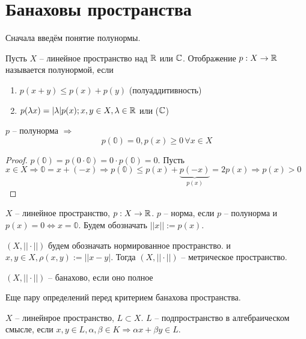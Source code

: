 \documentclass[document]{subfiles}
\begin{document}
\section{Банаховы пространства}

Сначала введём понятие полунормы.
\begin{definition}[полунорма]
    Пусть $X$ -- линейное пространство над $\mathbb{R}$ или $\mathbb{C}$. Отображение $p: X \rightarrow \mathbb{R}$ называется полунормой, если
    \begin{enumerate}
        \item $p(x + y) \leq p(x) + p(y)$ (полуаддитивность)
        \item $p(\lambda x) = |\lambda| p(x); x,y \in X, \lambda \in \mathbb{R}$ или ($\mathbb{C}$)
    \end{enumerate} 
\end{definition}

\begin{property}
    $p$ -- полунорма $\Rightarrow$
    \[ p(\mathbb{0}) = 0, p(x) \geq 0 \, \forall x \in X\]
\end{property}

\begin{proof}
    $p(\mathbb{0}) = p(0 \cdot \mathbb{0}) = 0 \cdot p(\mathbb{0}) = 0$.
    Пусть $x \in X \Rightarrow \mathbb{0} = x + (-x) \Rightarrow p(\mathbb{0}) \leq p(x) + \underbrace{p(-x)}_{p(x)} = 2p(x) \Rightarrow p(x) > 0$
\end{proof}

\begin{definition}[Норма]
    $X$ -- линейное пространство, $p : X \rightarrow \mathbb{R}$. $p$ -- норма, если $p$ -- полунорма и $p(x) = 0 \Leftrightarrow x = \mathbb{0}$.
    Будем обозначать $||x|| := p(x)$.
\end{definition}
$(X, || \cdot ||)$ будем обозначать нормированное пространство. и $x,y \in X, \rho(x,y) := ||x-y|$. Тогда $(X,||\cdot ||)$ -- метрическое пространство.

\begin{definition}
    $(X, || \cdot ||)$ -- банахово, если оно полное
\end{definition}
Еще пару определений перед критерием банахова пространства.

\begin{definition}
    $X$ -- линейнрое пространство, $L \subset X$. $L$ -- подпространство в алгебраическом смысле, если $x,y \in L, \alpha,\beta \in K \Rightarrow \alpha x + \beta y \in L$.
\end{definition}
\end{document}
